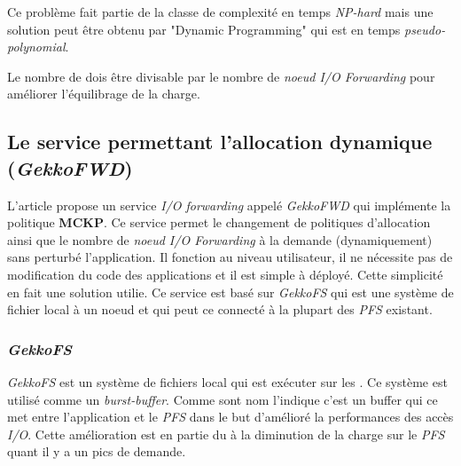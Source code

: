 \documentclass[10pt, a4paper]{article}
\begin{document}
Ce problème fait partie de la classe de complexité en temps \emph{NP-hard} mais une solution peut être obtenu par "Dynamic Programming" qui est en temps \emph{pseudo-polynomial}.

Le nombre de \noeudsDeCalculs{} dois être divisable par le nombre de \emph{noeud I/O Forwarding} pour améliorer l'équilibrage de la charge.


\subsection{Le service permettant l'allocation dynamique (\emph{GekkoFWD})}

L'article propose un service \emph{I/O forwarding} appelé \emph{GekkoFWD} qui
implémente la politique \textbf{MCKP}. Ce service permet le changement de politiques d'allocation ainsi que le nombre de \emph{noeud I/O Forwarding} à la demande (dynamiquement) sans perturbé l'application. Il fonction au niveau utilisateur, il ne nécessite pas de modification du code des applications et il est simple à déployé. Cette simplicité en fait une solution utilie.
Ce service est basé sur \emph{GekkoFS} qui est une système de fichier local à un noeud et qui peut ce connecté à la plupart des \emph{PFS} existant.

\subsubsection{\emph{GekkoFS}}

\emph{GekkoFS} est un système de fichiers local qui est exécuter sur les \noeudsDeCalculs{}. Ce système est utilisé comme un \emph{burst-buffer}. Comme sont nom l'indique c'est un buffer qui ce met entre l'application et le \emph{PFS} dans le but d'amélioré la performances des accès \emph{I/O}. Cette amélioration est en partie du à la diminution de la charge sur le \emph{PFS} quant il y a un pics de demande.
\end{document}
